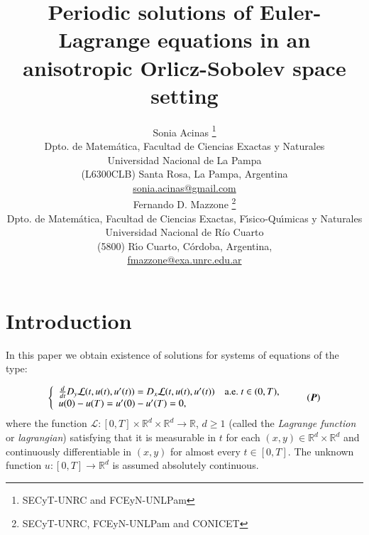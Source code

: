\documentclass[twoside]{article}
\title{Periodic solutions of
Euler-Lagrange equations in an anisotropic Orlicz-Sobolev space setting  }
\author{Sonia Acinas \thanks{SECyT-UNRC and  FCEyN-UNLPam}\\
Dpto. de Matem\'atica, Facultad de Ciencias Exactas y Naturales\\
Universidad Nacional de La Pampa\\
(L6300CLB) Santa Rosa, La Pampa, Argentina\\
\url{sonia.acinas@gmail.com}\\[3mm]
Fernando D. Mazzone \thanks{SECyT-UNRC, FCEyN-UNLPam and CONICET}\\
Dpto. de Matem\'atica, Facultad de Ciencias Exactas, F\'{\i}sico-Qu\'{\i}micas y Naturales\\
Universidad Nacional de R\'{i}o Cuarto\\
(5800) R\'{\i}o Cuarto, C\'ordoba, Argentina,\\
\url{fmazzone@exa.unrc.edu.ar}
}
\date{}
\theoremstyle{remark}
\renewcommand{\b}[1]{\boldsymbol{#1}}
\newcommand{\rr}{\mathbb{R}}
\renewcommand{\geq}{\geqslant}
\begin{document}
\maketitle
%
\begingroup%
    \renewcommand{\thefootnote}{}%
    \endgroup
%
%
%
%

\begin{abstract}


\end{abstract}






\pagestyle{fancy} \headheight 35pt \fancyhead{} \fancyfoot{}

\fancyfoot[C]{\thepage}  \fancyhead[CO]{\nouppercase{\section}}

\fancyhead[CO]{\nouppercase{\leftmark}}






\section{Introduction}


In this paper we obtain existence of solutions for systems  of equations of the type:

\begin{equation}\label{ProbPrin-gral}
    \left\{%
\begin{array}{ll}
  \frac{d}{dt} D_{y}\mathcal{L}(t,u(t),u'(t))= D_{x}\mathcal{L}(t,u(t),u'(t)) \quad \hbox{a.e.}\ t \in (0,T),\\
    u(0)-u(T)=u'(0)-u'(T)=0,
\end{array}%
\right. \tag{$\b{P}$}
\end{equation}
where the function $\mathcal{L}:[0,T]\times\rr^d\times\rr^d\to\rr$, $d\geq 1$ (called the \emph{Lagrange function} or \emph{lagrangian}) satisfying  that  it is measurable in $t$ for each $(x,y)\in \rr^d\times\rr^d$ and  continuously differentiable in $(x,y)$ for almost every $t \in [0,T]$. The unknown function  $u:[0,T]\to\rr^d$ is assumed absolutely continuous. 
\end{document}
